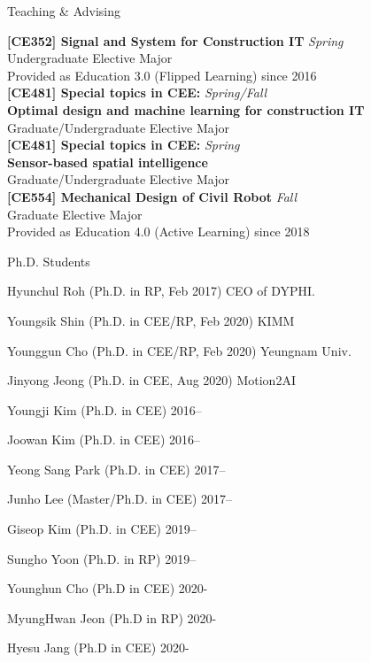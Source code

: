 \begin{rSection}{Teaching \& Advising}

{\bf[CE352] Signal and System for Construction IT} \hfill {\em Spring} \\
Undergraduate Elective Major \\
Provided as Education 3.0 (Flipped Learning) since 2016\\

{\bf[CE481] Special topics in CEE:} \hfill {\em Spring/Fall} \\
{\bf Optimal design and machine learning for construction IT}\\
Graduate/Undergraduate Elective Major \\

{\bf[CE481] Special topics in CEE:} \hfill {\em Spring} \\
{\bf Sensor-based spatial intelligence}\\
Graduate/Undergraduate Elective Major \\

{\bf[CE554] Mechanical Design of Civil Robot } \hfill {\em Fall} \\
Graduate Elective Major \\
Provided as Education 4.0 (Active Learning) since 2018\\

\begin{rSubsection}{Ph.D. Students}{}{}{}
  \item Hyunchul Roh (Ph.D. in \acf{RP}, Feb 2017) \hfill CEO of DYPHI.
  \item Youngsik Shin (Ph.D. in \ac{CEE}/\ac{RP}, Feb 2020) \hfill KIMM
  \item Younggun Cho (Ph.D. in \ac{CEE}/\ac{RP}, Feb 2020) \hfill Yeungnam Univ.
  \item Jinyong Jeong (Ph.D. in \ac{CEE}, Aug 2020) \hfill Motion2AI
  \item Youngji Kim (Ph.D. in \ac{CEE}) \hfill 2016--
  \item Joowan Kim (Ph.D. in \ac{CEE}) \hfill 2016--
  \item Yeong Sang Park (Ph.D. in \ac{CEE}) \hfill 2017--
  \item Junho Lee (Master/Ph.D. in \ac{CEE}) \hfill 2017--
  \item Giseop Kim (Ph.D. in \ac{CEE}) \hfill 2019--
  \item Sungho Yoon (Ph.D. in \ac{RP}) \hfill 2019--
  \item Younghun Cho (Ph.D in \ac{CEE}) \hfill 2020-
  \item MyungHwan Jeon (Ph.D in \ac{RP}) \hfill 2020-
  \item Hyesu Jang (Ph.D in \ac{CEE}) \hfill 2020-
\end{rSubsection}


\end{rSection}
